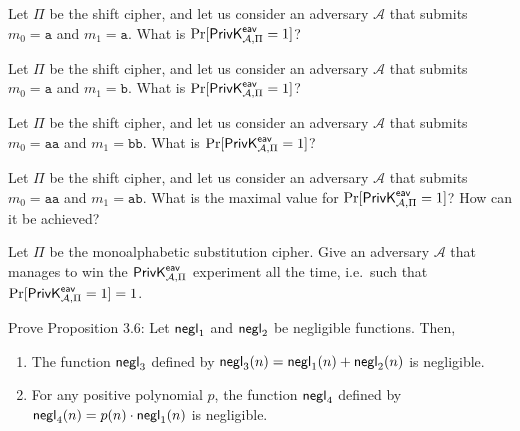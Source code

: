\documentclass[a4paper,10pt,landscape,twocolumn]{scrartcl}
\begin{document}
\begin{exercise}
\begin{subex}
Let $\Pi$ be the shift cipher, and let us consider an adversary $\mathcal{A}$ that submits $m_0 = \mathtt{a}$ and $m_1 = \mathtt{a}$. What is $\Pr[\mathsf{PrivK}^{\mathsf{eav}}_{\mathcal{A},\Pi}=1]$?
\end{subex}

\begin{subex}
Let $\Pi$ be the shift cipher, and let us consider an adversary $\mathcal{A}$ that submits $m_0 = \mathtt{a}$ and $m_1 = \mathtt{b}$. What is $\Pr[\mathsf{PrivK}^{\mathsf{eav}}_{\mathcal{A},\Pi}=1]$?
\end{subex}

\begin{subex}
Let $\Pi$ be the shift cipher, and let us consider an adversary $\mathcal{A}$ that submits $m_0 = \mathtt{aa}$ and $m_1 = \mathtt{bb}$. What is $\Pr[\mathsf{PrivK}^{\mathsf{eav}}_{\mathcal{A},\Pi}=1]$?
\end{subex}

\begin{subex}
Let $\Pi$ be the shift cipher, and let us consider an adversary $\mathcal{A}$ that submits $m_0 = \mathtt{aa}$ and $m_1 = \mathtt{ab}$. What is the maximal value for $\Pr[\mathsf{PrivK}^{\mathsf{eav}}_{\mathcal{A},\Pi}=1]$? How can it be achieved?
\end{subex}

\begin{subex}
Let $\Pi$ be the monoalphabetic substitution cipher. Give an adversary $\mathcal{A}$ that manages to win the $\mathsf{PrivK}^{\mathsf{eav}}_{\mathcal{A},\Pi}$ experiment all the time, i.e.\ such that $\Pr[\mathsf{PrivK}^{\mathsf{eav}}_{\mathcal{A},\Pi}=1] = 1$.
\end{subex}
\end{exercise}


\begin{exercise}
Prove Proposition 3.6:
Let $\mathsf{negl}_1$ and $\mathsf{negl}_2$ be negligible functions. Then,
\begin{enumerate}
\item The function $\mathsf{negl}_3$ defined by $\mathsf{negl}_3(n) = \mathsf{negl}_1(n)+\mathsf{negl}_2(n)$ is
  negligible.
\item For any positive polynomial $p$, the function $\mathsf{negl}_4$ defined
  by $\mathsf{negl}_4(n) = p(n) \cdot \mathsf{negl}_1(n)$ is negligible.
\end{enumerate}
\end{exercise}
\end{document}
